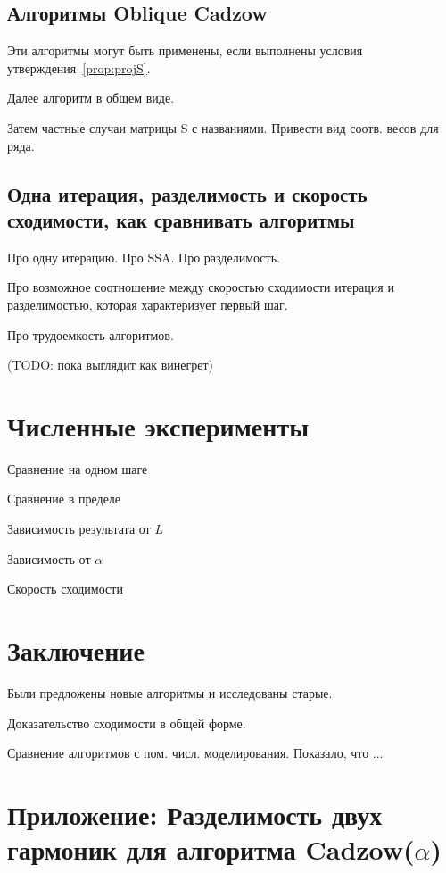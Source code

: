 \documentclass[12pt,a4paper,fleqn,leqno]{article}
\begin{document}
\subsection{Алгоритмы Oblique Cadzow}

Эти алгоритмы могут быть применены, если выполнены условия утверждения~\ref{prop:projS}.

Далее алгоритм в общем виде.

Затем частные случаи матрицы S с названиями. Привести вид соотв. весов для ряда.

\subsection{Одна итерация, разделимость и скорость сходимости, как сравнивать алгоритмы}

Про одну итерацию. Про SSA. Про разделимость. 

Про возможное соотношение между скоростью сходимости итерация и разделимостью,
которая характеризует первый шаг.

Про трудоемкость алгоритмов.

(TODO: пока выглядит как винегрет)

\section{Численные эксперименты}

Сравнение на одном шаге

Сравнение в пределе

Зависимость результата от $L$

Зависимость от $\alpha$

Скорость сходимости

\section{Заключение}
Были предложены новые алгоритмы и исследованы старые.

Доказательство сходимости в общей форме.

Сравнение алгоритмов с пом. числ. моделирования.
Показало, что ...

\section{Приложение: Разделимость двух гармоник для алгоритма Cadzow($\alpha$)}
 


\end{document}
